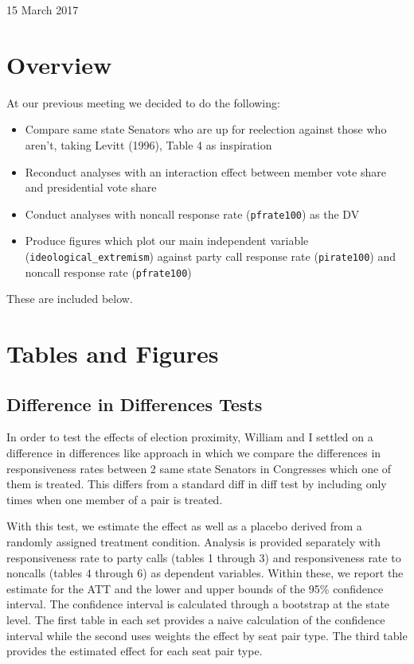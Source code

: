 \documentclass[12pt]{article}
\begin{document}
	
\begin{center}
	\Large 15 March 2017
\end{center}

\section{Overview}

At our previous meeting we decided to do the following:

\begin{itemize}
	\item Compare same state Senators who are up for reelection against those who aren't, taking Levitt (1996), Table 4 as inspiration
	
	\item Reconduct analyses with an interaction effect between member vote share and presidential vote share
	
	\item Conduct analyses with noncall response rate (\verb|pfrate100|) as the DV
	
	\item Produce figures which plot our main independent variable (\verb|ideological_extremism|) against party call response rate (\verb|pirate100|) and noncall response rate (\verb|pfrate100|)
\end{itemize}

\noindent
These are included below.

\section{Tables and Figures}

\subsection{Difference in Differences Tests}

In order to test the effects of election proximity, William and I settled on a difference in differences like approach in which we compare the differences in responsiveness rates between 2 same state Senators in Congresses which one of them is treated. This differs from a standard diff in diff test by including only times when one member of a pair is treated. 

With this test, we estimate the effect as well as a placebo derived from a randomly assigned treatment condition. Analysis is provided separately with responsiveness rate to party calls (tables 1 through 3) and responsiveness rate to noncalls (tables 4 through 6) as dependent variables. Within these, we report the estimate for the ATT and the lower and upper bounds of the 95\% confidence interval. The confidence interval is calculated through a bootstrap at the state level. The first table in each set provides a naive calculation of the confidence interval while the second uses weights the effect by seat pair type. The third table provides the estimated effect for each seat pair type.
\end{document}
